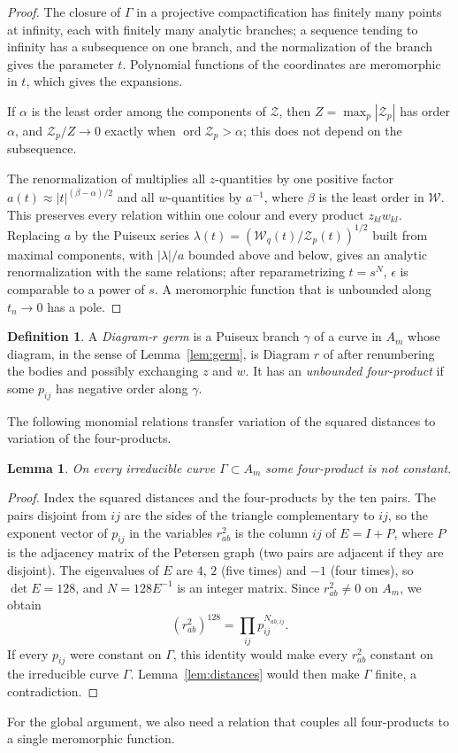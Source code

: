 \documentclass[Threeside,11pt]{article}
\newtheorem{lemma}[theorem]{Lemma}
\theoremstyle{definition}
\newtheorem{definition}[theorem]{Definition}
\theoremstyle{remark}
\numberwithin{equation}{section}
\theoremstyle{remark}
\newcommand{\ord}{\operatorname{ord}}
\begin{document}
\begin{proof}
The closure of $\Gamma$ in a projective compactification has finitely many points at infinity,
each with finitely many analytic branches; a sequence tending to infinity has a subsequence on
one branch, and the normalization of the branch gives the parameter $t$.  Polynomial functions
of the coordinates are meromorphic in $t$, which gives the expansions.

If $\alpha$ is the least
order among the components of $\mathcal Z$, then $Z=\max_p|\mathcal Z_p|$ has order $\alpha$, and
$\mathcal Z_p/Z\to0$ exactly when $\ord\mathcal Z_p>\alpha$; this does not depend on the
subsequence.

The renormalization of \cite[p.~547]{AK} multiplies all $z$-quantities by one
positive factor $a(t)\approx|t|^{(\beta-\alpha)/2}$ and all $w$-quantities by $a^{-1}$, where
$\beta$ is the least order in $\mathcal W$.  This preserves every relation within one colour and
every product $z_{kl}w_{kl}$.  Replacing $a$ by the Puiseux series $\lambda(t)=(\mathcal W_q(t)/
\mathcal Z_p(t))^{1/2}$ built from maximal components, with $|\lambda|/a$ bounded above and
below, gives an analytic renormalization with the same relations; after reparametrizing
$t=s^N$, $\epsilon$ is comparable to a power of $s$.  A meromorphic function that is unbounded
along $t_n\to0$ has a pole.
\end{proof}

\begin{definition}\label{def:germ}
A \emph{Diagram-$r$ germ} is a Puiseux branch $\gamma$ of a curve in $A_m$ whose diagram, in the
sense of Lemma~\ref{lem:germ}, is Diagram $r$ of \cite[Fig.~11]{AK} after renumbering the bodies
and possibly exchanging $z$ and $w$.  It has an \emph{unbounded four-product} if some $p_{ij}$ has
negative order along $\gamma$.
\end{definition}

The following monomial relations transfer variation of the squared distances to variation
of the four-products.

\begin{lemma}\label{lem:petersen}
On every irreducible curve $\Gamma\subset A_m$ some four-product is not constant.
\end{lemma}
\begin{proof}
Index the squared distances and the four-products by the ten pairs.  The pairs disjoint from
$ij$ are the sides of the triangle complementary to $ij$, so the exponent vector of $p_{ij}$ in
the variables $r_{ab}^2$ is the column $ij$ of $E=I+P$, where $P$ is the adjacency matrix of the
Petersen graph (two pairs are adjacent if they are disjoint).  The eigenvalues of $E$ are $4$,
$2$ (five times) and $-1$ (four times), so $\det E=128$, and $N=128E^{-1}$ is an integer
matrix.  Since $r_{ab}^2\ne0$ on $A_m$, we obtain
\[
 (r_{ab}^2)^{128}=\prod_{ij}p_{ij}^{N_{ab,ij}}.
\]
If every $p_{ij}$ were constant on $\Gamma$, this identity would make every $r_{ab}^2$
constant on the irreducible curve $\Gamma$.  Lemma~\ref{lem:distances} would then make
$\Gamma$ finite, a contradiction.
\end{proof}
For the global argument, we also need a relation that couples all four-products to a
single meromorphic function.
\end{document}
